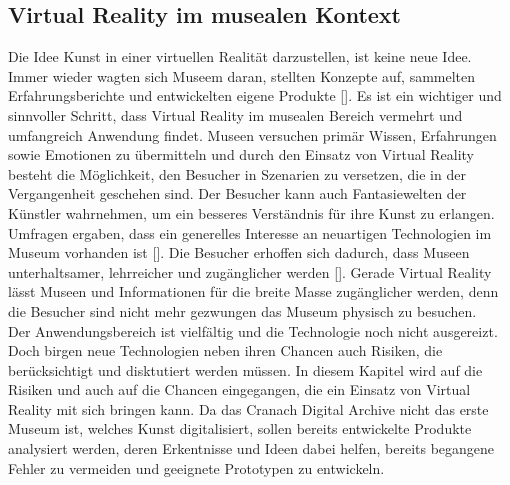 \documentclass[a4paper,12pt,oneside]{article}
\begin{document}
    \subsection{Virtual Reality im musealen Kontext}
      Die Idee Kunst in einer virtuellen Realität darzustellen, ist keine neue Idee.
      Immer wieder wagten sich Museem daran, stellten Konzepte auf, sammelten
      Erfahrungsberichte und entwickelten eigene Produkte [\cite{Heidsiek2019}]. Es ist
      ein wichtiger und sinnvoller Schritt, dass Virtual Reality
      im musealen Bereich vermehrt und umfangreich Anwendung findet. Museen versuchen
      primär Wissen, Erfahrungen sowie Emotionen zu übermitteln und 
      durch den Einsatz von Virtual Reality
      besteht die Möglichkeit, den Besucher in Szenarien zu versetzen, die in der
      Vergangenheit geschehen sind. Der Besucher kann auch Fantasiewelten der Künstler
      wahrnehmen, um ein besseres Verständnis für ihre Kunst zu erlangen. Umfragen ergaben, 
      dass ein generelles Interesse an neuartigen Technologien im Museum vorhanden ist [\cite[34]{Heidsiek2019}].
      Die Besucher erhoffen sich dadurch, dass Museen unterhaltsamer, lehrreicher und
      zugänglicher werden [\cite[34]{Heidsiek2019}]. Gerade Virtual Reality lässt Museen
      und Informationen für die breite Masse zugänglicher werden, denn die Besucher 
      sind nicht mehr gezwungen 
      das Museum physisch zu besuchen. \\
      Der Anwendungsbereich ist vielfältig und die 
      Technologie noch nicht ausgereizt.
      Doch birgen neue Technologien neben ihren Chancen auch Risiken, die berücksichtigt
      und disktutiert werden müssen. In diesem Kapitel wird auf die
      Risiken und auch auf die Chancen eingegangen, die ein Einsatz von
      Virtual Reality mit sich bringen kann. Da das Cranach Digital Archive nicht das erste Museum ist, 
      welches Kunst digitalisiert, sollen bereits entwickelte Produkte analysiert
      werden, deren Erkentnisse und Ideen dabei helfen, bereits begangene Fehler zu 
      vermeiden und geeignete Prototypen zu entwickeln.
\end{document}
